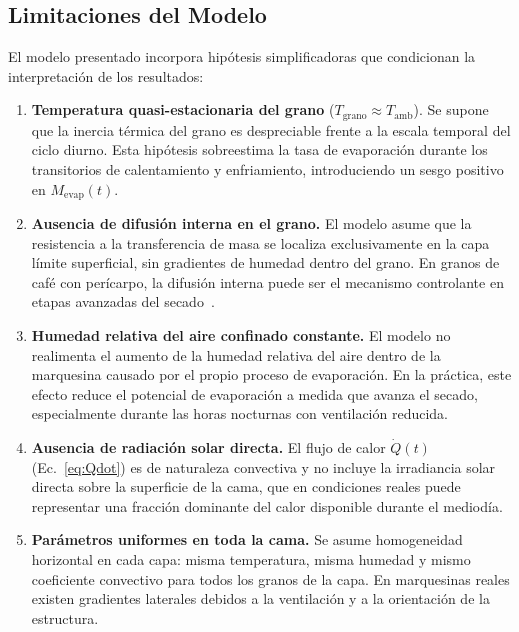 \documentclass[conference]{IEEEtran}
\begin{document}
\subsection{Limitaciones del Modelo}
\label{sec:limitaciones}

El modelo presentado incorpora hipótesis simplificadoras que condicionan la interpretación de los resultados:

\begin{enumerate}

\item \textbf{Temperatura quasi-estacionaria del grano} ($T_{\text{grano}} \approx T_{\text{amb}}$). Se supone que la inercia térmica del grano es despreciable frente a la escala temporal del ciclo diurno. Esta hipótesis sobreestima la tasa de evaporación durante los transitorios de calentamiento y enfriamiento, introduciendo un sesgo positivo en $M_{\text{evap}}(t)$.

\item \textbf{Ausencia de difusión interna en el grano.} El modelo asume que la resistencia a la transferencia de masa se localiza exclusivamente en la capa límite superficial, sin gradientes de humedad dentro del grano. En granos de café con perícarpo, la difusión interna puede ser el mecanismo controlante en etapas avanzadas del secado~\cite{ciro10}.

\item \textbf{Humedad relativa del aire confinado constante.} El modelo no realimenta el aumento de la humedad relativa del aire dentro de la marquesina causado por el propio proceso de evaporación. En la práctica, este efecto reduce el potencial de evaporación a medida que avanza el secado, especialmente durante las horas nocturnas con ventilación reducida.

\item \textbf{Ausencia de radiación solar directa.} El flujo de calor $\dot{Q}(t)$ (Ec.~\ref{eq:Qdot}) es de naturaleza convectiva y no incluye la irradiancia solar directa sobre la superficie de la cama, que en condiciones reales puede representar una fracción dominante del calor disponible durante el mediodía.

\item \textbf{Parámetros uniformes en toda la cama.} Se asume homogeneidad horizontal en cada capa: misma temperatura, misma humedad y mismo coeficiente convectivo para todos los granos de la capa. En marquesinas reales existen gradientes laterales debidos a la ventilación y a la orientación de la estructura.

\end{enumerate}
\end{document}
